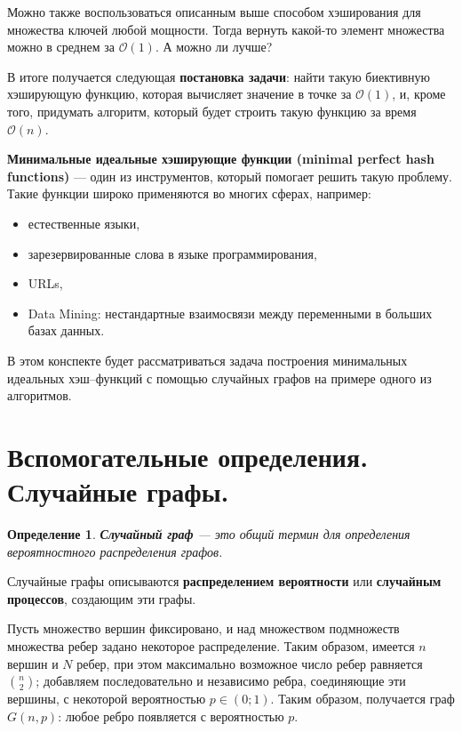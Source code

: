 \documentclass[specialist,
               substylefile = spbu.rtx,
               subf,href,colorlinks=true, 12pt]{disser}
\newtheorem{mydef}{Определение}
\begin{document}
Можно также воспользоваться описанным выше способом хэширования для множества ключей любой мощности. Тогда вернуть какой-то элемент множества можно в среднем за $\mathcal{O}(1)$. А можно ли лучше?

В итоге получается следующая \textbf{постановка задачи}: найти такую биективную хэширующую функцию, которая вычисляет значение в точке за $\mathcal{O}(1)$, и, кроме того, придумать алгоритм, который будет строить такую функцию за время $\mathcal{O}(n)$.

\textbf{Минимальные идеальные хэширующие функции (minimal perfect hash functions)} --- один из инструментов, который помогает решить такую проблему. Такие функции широко применяются во многих сферах, например:

\begin{itemize}
\item естественные языки,
\item зарезервированные слова в языке программирования,
\item URLs,
\item Data Mining: нестандартные взаимосвязи между переменными в больших базах данных.
\end{itemize}

В этом конспекте будет рассматриваться задача построения минимальных идеальных хэш--функций с помощью случайных графов на примере одного из алгоритмов.

\newpage

\section{Вспомогательные определения. Случайные графы.}

\begin{mydef}
\textbf{Случайный граф} --- это общий термин для определения вероятностного распределения графов.
\end{mydef}

Случайные графы описываются \textbf{распределением вероятности} или \textbf{случайным процессов}, создающим эти графы.

Пусть множество вершин фиксировано, и над множеством подмножеств множества ребер задано некоторое распределение. Таким образом, имеется $n$ вершин и  $N$ ребер, при этом максимально возможное число ребер равняется $\binom{n}{2}$; добавляем последовательно и независимо ребра, соединяющие эти вершины, с некоторой вероятностью $p \in (0;1)$. Таким образом, получается граф $G(n,p)$: любое ребро появляется с вероятностью $p$.
\end{document}
